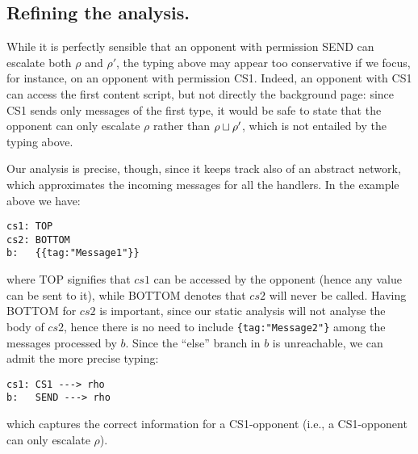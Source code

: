 \subsection{Refining the analysis.}
While it is perfectly sensible that an opponent with permission SEND can escalate both $\rho$ and $\rho'$, the typing above may appear too conservative if we focus, for instance, on an opponent with permission CS1. Indeed, an opponent with CS1 can access the first content script, but not directly the background page: since CS1 sends only messages of the first type, it would be safe to state that the opponent can only escalate $\rho$ rather than $\rho \sqcup \rho'$, which is not entailed by the typing above.

Our analysis is precise, though, since it keeps track also of an abstract network, which approximates the incoming messages for all the handlers. In the example above we have:
\begin{verbatim}
cs1: TOP
cs2: BOTTOM
b:   {{tag:"Message1"}}
\end{verbatim}
where TOP signifies that $cs1$ can be accessed by the opponent (hence any value can be sent to it), while BOTTOM denotes that $cs2$ will never be called. Having BOTTOM for $cs2$ is important, since our static analysis will not analyse the body of $cs2$, hence there is no need to include \texttt{\{tag:"Message2"\}} among the messages processed by $b$. Since the ``else'' branch in $b$ is unreachable, we can admit the more precise typing:
\begin{verbatim}
cs1: CS1 ---> rho
b:   SEND ---> rho
\end{verbatim}
which captures the correct information for a CS1-opponent (i.e., a CS1-opponent can only escalate $\rho$). 

